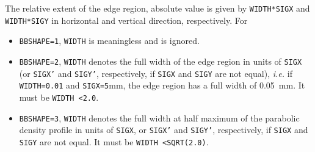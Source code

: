 \begin{madlist}
    The relative extent of the edge region, absolute value is 
   given by \texttt{WIDTH*SIGX} and \texttt{WIDTH*SIGY} in horizontal and vertical 
   direction, respectively. For 
   \begin{itemize}
     \item  \texttt{BBSHAPE=1}, \texttt{WIDTH} is meaningless and is ignored.
     \item  \texttt{BBSHAPE=2}, \texttt{WIDTH} denotes the full width of the edge 
       region in units of \texttt{SIGX} (or \texttt{SIGX'} and \texttt{SIGY'}, 
       respectively, if \texttt{SIGX} and \texttt{SIGY} are not equal), \textsl{i.e.} 
       if \texttt{WIDTH=0.01} and \texttt{SIGX=5}mm, the edge  region has a full 
       width of 0.05\ mm. It must be \texttt{WIDTH \textless 2.0}.
     \item  \texttt{BBSHAPE=3}, \texttt{WIDTH} denotes the full width at half 
       maximum of the parabolic density profile in units of
       \texttt{SIGX}, or \texttt{SIGX'} and \texttt{SIGY'},
       respectively, if \texttt{SIGX} and \texttt{SIGY} are  
       not equal. It must be \texttt{WIDTH \textless SQRT(2.0)}.
   \end{itemize} 
   

\end{madlist}
